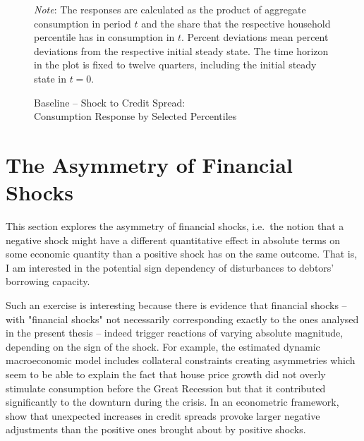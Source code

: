 \documentclass[a4paper,12pt]{article} %
\numberwithin{equation}{section} %
\numberwithin{figure}{section}
\numberwithin{table}{section}
\begin{document}
\begin{figure}[t]
    \centering
    \caption{Baseline -- Shock to Credit Spread: \\ Consumption Response by Selected Percentiles}
    \label{fig:baseline-permanent-wedge-dist-c-response}
    
    
    \vspace{10pt}
    
    \begin{minipage}{0.75\textwidth} 
    \footnotesize
    \textit{Note}: The responses are calculated as the product of aggregate consumption in period $t$ and the share that the respective household percentile has in consumption in $t$. Percent deviations mean percent deviations from the respective initial steady state. The time horizon in the plot is fixed to twelve quarters, including the initial steady state in $t=0$.
    \end{minipage}
\end{figure}

\section{The Asymmetry of Financial Shocks}
\label{sec:asymmetry}

This section explores the asymmetry of financial shocks, i.e.~the notion that a negative shock might have a different quantitative effect in absolute terms on some economic quantity than a positive shock has on the same outcome. That is, I am interested in the potential sign dependency of disturbances to debtors' borrowing capacity.

Such an exercise is interesting because there is evidence that financial shocks -- with "financial shocks" not necessarily corresponding exactly to the ones analysed in the present thesis --  indeed trigger reactions of varying absolute magnitude, depending on the sign of the shock. For example, the estimated dynamic macroeconomic model\textcite{guerrieri2017asym} includes collateral constraints creating asymmetries which seem to be able to explain the fact that house price growth did not overly stimulate consumption before the Great Recession but that it contributed significantly to the downturn during the crisis. In an econometric framework, \textcite{barnichon2022} show that unexpected increases in credit spreads provoke larger negative adjustments than the positive ones brought about by positive shocks. 
\end{document}
